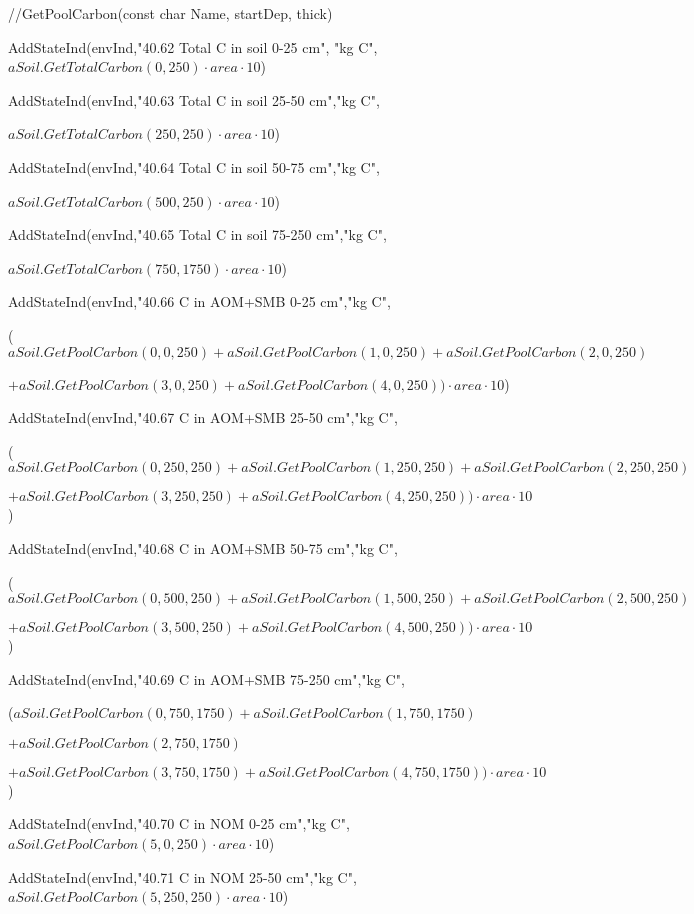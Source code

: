 \documentclass[%
]{scrartcl}
\begin{document}
{{{   //GetPoolCarbon(const char   Name,   startDep,   thick)

	AddStateInd(envInd,"40.62 Total C in soil 0-25 cm",
"kg C",$aSoil.GetTotalCarbon(0,250) \cdot area \cdot 10$)
	 
AddStateInd(envInd,"40.63 Total C in soil 25-50 cm","kg C",

$aSoil.GetTotalCarbon(250,250) \cdot area \cdot 10$)
	 
AddStateInd(envInd,"40.64 Total C in soil 50-75 cm","kg C",

$aSoil.GetTotalCarbon(500,250) \cdot area \cdot 10$)
	
AddStateInd(envInd,"40.65 Total C in soil 75-250 cm","kg C",

$aSoil.GetTotalCarbon(750,1750) \cdot area \cdot 10$)
	 
AddStateInd(envInd,"40.66 C in AOM+SMB 0-25 cm","kg C",
	   	
 ($aSoil.GetPoolCarbon(0,0,250)+aSoil.GetPoolCarbon(1,0,250)+aSoil.GetPoolCarbon(2,0,250)$

$+
	      aSoil.GetPoolCarbon(3,0,250)+aSoil.GetPoolCarbon(4,0,250))
 \cdot area \cdot 10$)
		
AddStateInd(envInd,"40.67 C in AOM+SMB 25-50 cm","kg C",
	   	
 ($aSoil.GetPoolCarbon(0,250,250)+aSoil.GetPoolCarbon(1,250,250)+aSoil.GetPoolCarbon(2,250,250)$

$+aSoil.GetPoolCarbon(3,250,250)+aSoil.GetPoolCarbon(4,250,250)) \cdot area \cdot 10$
)
		
AddStateInd(envInd,"40.68 C in AOM+SMB 50-75 cm","kg C",
	   	
 ($aSoil.GetPoolCarbon(0,500,250)+aSoil.GetPoolCarbon(1,500,250)+aSoil.GetPoolCarbon(2,500,250)$
	      
$+aSoil.GetPoolCarbon(3,500,250)+aSoil.GetPoolCarbon(4,500,250))
 \cdot area \cdot 10$)
		 
AddStateInd(envInd,"40.69 C in AOM+SMB 75-250 cm","kg C",
	   	 
($aSoil.GetPoolCarbon(0,750,1750)+aSoil.GetPoolCarbon(1,750,1750)$

$+aSoil.GetPoolCarbon(2,750,1750)$


$+    
  aSoil.GetPoolCarbon(3,750,1750)+aSoil.GetPoolCarbon(4,750,1750)) 
\cdot area \cdot 10$)
		
AddStateInd(envInd,"40.70 C in NOM 0-25 cm","kg C",
$aSoil.GetPoolCarbon(5,0,250) \cdot area \cdot 10$)
		 
AddStateInd(envInd,"40.71 C in NOM 25-50 cm","kg C",
$aSoil.GetPoolCarbon(5,250,250) \cdot area \cdot 10$)
		 
}}}
\end{document}
